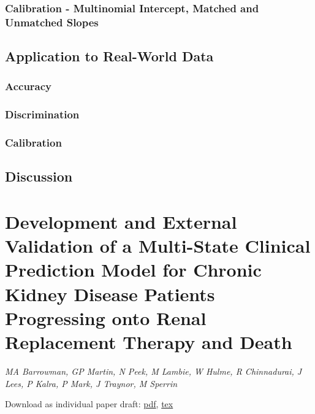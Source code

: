 \documentclass[12pt,PhD,twoside,openright]{muthesis}
\begin{document}
\hypertarget{calibration---multinomial-intercept-matched-and-unmatched-slopes}{%
\subsection{Calibration - Multinomial Intercept, Matched and Unmatched Slopes}\label{calibration---multinomial-intercept-matched-and-unmatched-slopes}}

\hypertarget{application-to-real-world-data}{%
\section{Application to Real-World Data}\label{application-to-real-world-data}}

\hypertarget{accuracy}{%
\subsection{Accuracy}\label{accuracy}}

\hypertarget{discrimination}{%
\subsection{Discrimination}\label{discrimination}}

\hypertarget{calibration}{%
\subsection{Calibration}\label{calibration}}

\hypertarget{discussion-1}{%
\section{Discussion}\label{discussion-1}}

\hypertarget{chap-dev-paper}{%
\chapter{Development and External Validation of a Multi-State Clinical Prediction Model for Chronic Kidney Disease Patients Progressing onto Renal Replacement Therapy and Death}\label{chap-dev-paper}}

\emph{MA Barrowman, GP Martin, N Peek, M Lambie, W Hulme, R Chinnadurai, J Lees, P Kalra, P Mark, J Traynor, M Sperrin}

Download as individual paper draft: \href{Chapters/ind_06-Dev_Paper.pdf}{pdf}, \href{Chapters/ind_06-Dev_Paper.tex}{tex}
\end{document}
